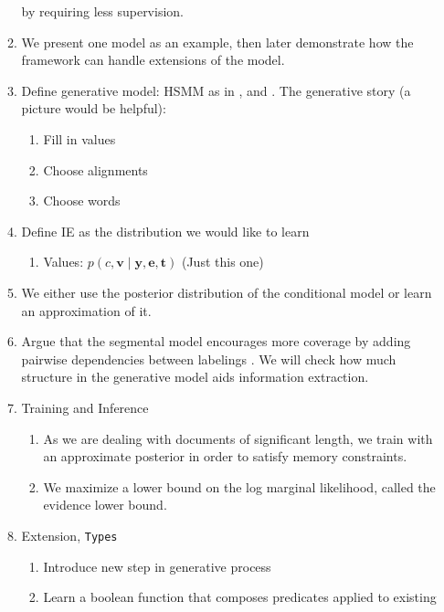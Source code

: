 \documentclass[11pt]{article}
\newcommand{\be}{\mathbf{e}}
\newcommand{\br}{\mathbf{r}}
\newcommand{\bt}{\mathbf{t}}
\newcommand{\bv}{\mathbf{v}}
\newcommand{\by}{\mathbf{y}}
\begin{document}
\begin{enumerate}
\begin{enumerate}
        by requiring less supervision.
    \item We present one model as an example, then later demonstrate how the framework
        can handle extensions of the model.
    \item Define generative model: HSMM as in \citep{liang2009semalign},
        and \citep{wiseman2018template}.
        The generative story (a picture would be helpful):
        \begin{enumerate}
        \item Fill in values
        \item Choose alignments
        \item Choose words
        \end{enumerate}
    \item Define IE as the distribution we would like to learn
        \begin{enumerate}
        \item Values: $p(c,\bv\mid\by,\be,\bt)$ (Just this one)
        \end{enumerate}
    \item We either use the posterior distribution of the conditional model
        or learn an approximation of it.
    \item Argue that the segmental model encourages more coverage
        by adding pairwise dependencies between labelings \citep{liang2009semalign}.
        We will check how much structure in the generative model
        aids information extraction.
    \item Training and Inference
        \begin{enumerate}
        \item As we are dealing with documents of significant length,
            we train with an approximate posterior in order to satisfy memory constraints.
        \item We maximize a lower bound on the log marginal likelihood,
            called the evidence lower bound.
        \end{enumerate}
    \item Extension, \texttt{Types}
        \begin{enumerate}
        \item Introduce new step in generative process
        \item Learn a boolean function that composes predicates applied to existing

\end{enumerate}
\end{enumerate}
\end{enumerate}
\end{document}
